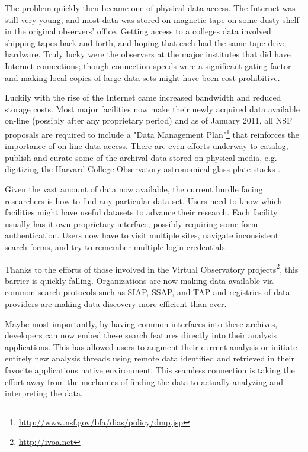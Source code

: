 The problem quickly then became one of physical data access.  The Internet
was still very young, and most data was stored on magnetic tape on
some dusty shelf in the original observers' office.  Getting access
to a colleges data involved shipping tapes back and forth, and
hoping that each had the same tape drive hardware.  Truly lucky were the
observers at the major institutes that did have Internet connections;
though connection speeds were a significant gating factor and making
local copies of large data-sets might have been cost prohibitive.

Luckily with the rise of the Internet came increased bandwidth and
reduced storage costs.  Most major facilities now make their newly
acquired data available on-line (possibly after any proprietary period)
and as of January 2011, all NSF proposals are required to include a "Data
Management Plan"\footnote{ \url{http://www.nsf.gov/bfa/dias/policy/dmp.jsp}}
 that reinforces the importance of on-line data access.
There are even efforts underway to catalog, publish and curate some of
the archival data stored on physical media, e.g. digitizing the Harvard
College Observatory astronomical glass plate stacks \citep{2006vopc.conf...54M}.

Given the vast amount of data now available, the current hurdle facing
researchers is how to find any particular data-set.  Users need to know
which facilities might have useful datasets to advance their research.
Each facility usually has it own proprietary interface; possibly
requiring some form authentication.  Users now have to visit multiple
sites,  navigate inconsistent search forms, and try to remember multiple
login credentials.

Thanks to the efforts of those involved in the Virtual Observatory
projects\footnote{ \url{http://ivoa.net}}, this barrier is quickly falling.  Organizations are now making
data available via common search protocols such as SIAP, SSAP, and TAP and  registries of data providers are making data discovery more
efficient than ever.

Maybe most importantly, by having common interfaces into these archives,
developers can now embed these search features directly into their
analysis applications.  This has allowed users to augment their current
analysis or initiate entirely new analysis threads using remote data 
identified and retrieved in 
their favorite applications native environment.  This seamless connection
is taking the effort away from the mechanics of finding the data to
actually analyzing and interpreting the data.

